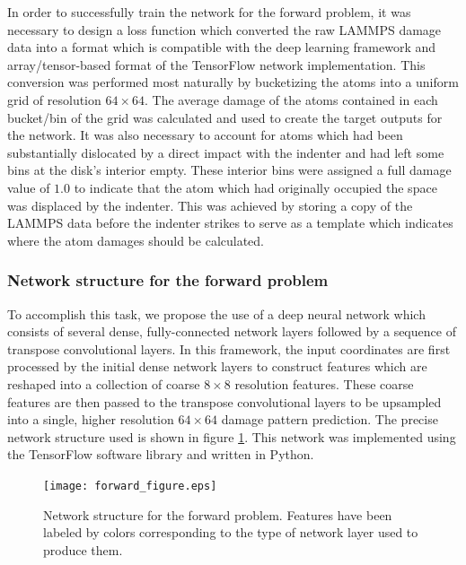 In order to successfully train the network for the forward problem, it was necessary to design a loss function which converted the raw LAMMPS damage data into a format which is compatible with the deep learning framework and array/tensor-based format of the TensorFlow network implementation.  This conversion was performed most naturally by bucketizing the atoms into a uniform grid of resolution $64 \times 64$.  The average damage of the atoms contained in each bucket/bin of the grid was calculated and used to create the target outputs for the network.  It was also necessary to account for atoms which had been substantially dislocated by a direct impact with the indenter and had left some bins at the disk's interior empty.  These interior bins were assigned a full damage value of $1.0$ to indicate that the atom which had originally occupied the space was displaced by the indenter.  This was achieved by storing a copy of the LAMMPS data before the indenter strikes to serve as a template which indicates where the atom damages should be calculated.


\subsubsection{Network structure for the forward problem}
\label{forward_network}

To accomplish this task, we propose the use of a deep neural network which consists of several dense, fully-connected network layers followed by a sequence of transpose convolutional layers.  In this framework, the input coordinates are first processed by the initial dense network layers to construct features which are reshaped into a collection of coarse $8 \times 8$ resolution features.  These coarse features are then passed to the transpose convolutional layers to be upsampled into a single, higher resolution $64 \times 64$ damage pattern prediction.  The precise network structure used is shown in figure \ref{fig:forward}.  This network was implemented using the TensorFlow software library and written in Python.

\begin{figure}
  \centering
  \texttt{[image: forward\_figure.eps]}
\caption{Network structure for the forward problem.  Features have been labeled by colors corresponding to the type of network layer used to produce them.}
\label{fig:forward}       
\end{figure}

